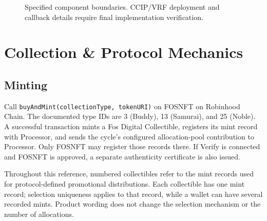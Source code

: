 \documentclass[
  10pt,
  letterpaper,
]{article}
\begin{document}
\begin{figure}[H]
\centering
{}
\caption{Specified component boundaries. CCIP/VRF deployment and callback details require final implementation verification.}
\end{figure}

\section{Collection \& Protocol
Mechanics}\label{collection-protocol-mechanics}

\subsection{Minting}\label{minting}

Call \texttt{buyAndMint(collectionType,\ tokenURI)} on FOSNFT on
Robinhood Chain. The documented type IDs are 3 (Buddy), 13 (Samurai),
and 25 (Noble). A successful transaction mints a Fos Digital
Collectible, registers its mint record with Processor, and sends the
cycle's configured allocation-pool contribution to Processor. Only
FOSNFT may register those records there. If Verify is connected and
FOSNFT is approved, a separate authenticity certificate is also issued.

Throughout this reference, numbered collectibles refer to the mint
records used for protocol-defined promotional distributions. Each
collectible has one mint record; selection uniqueness applies to that
record, while a wallet can have several recorded mints. Product wording
does not change the selection mechanism or the number of allocations.
\end{document}
